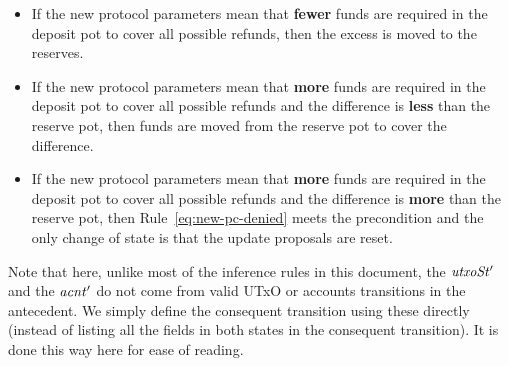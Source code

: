 \begin{itemize}
  \item If the new protocol parameters mean that \textbf{fewer} funds are required in the
    deposit pot to cover all possible refunds, then the excess is moved to the reserves.

  \item If the new protocol parameters mean that \textbf{more} funds are required in the
    deposit pot to cover all possible refunds and the difference is \textbf{less} than
    the reserve pot, then funds are moved from the reserve pot to cover the difference.

  \item If the new protocol parameters mean that \textbf{more} funds are required in the
    deposit pot to cover all possible refunds and the difference is \textbf{more} than
    the reserve pot, then Rule~\ref{eq:new-pc-denied} meets the precondition and the
    only change of state is that the update proposals are reset.
\end{itemize}

Note that here, unlike most of the inference rules in this document,
the $\mathit{utxoSt'}$ and the $\mathit{acnt'}$ do not come from valid UTxO or
accounts transitions in the antecedent. We simply define the consequent
transition using these directly (instead of listing all the fields in both
states in the consequent transition). It is done this way here
for ease of reading.

